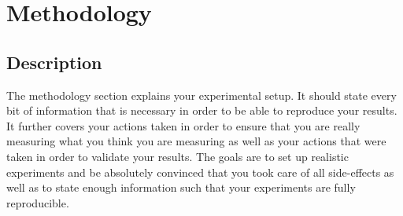\section{Methodology}
\label{sec:methodology}
\subsection{Description}
The methodology section explains your experimental setup.
It should state every bit of information that is necessary in
order to be able to reproduce your results. It further covers
your actions taken in order to ensure that you are really
measuring what you think you are measuring as well as your
actions that were taken in order to validate your results. The
goals are to set up realistic experiments and be absolutely
convinced that you took care of all side-effects as well as to
state enough information such that your experiments are fully
reproducible.
